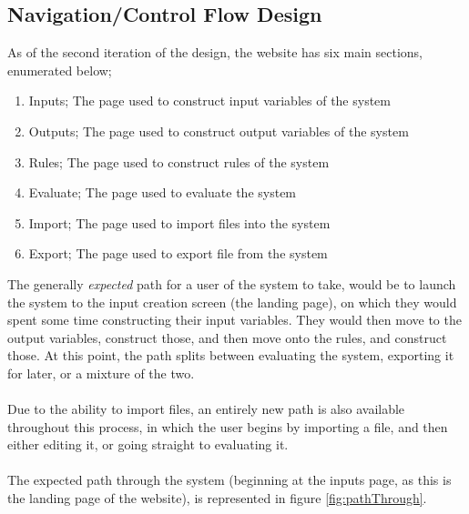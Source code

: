 \newpage
\subsection{Navigation/Control Flow Design}	
\label{subsec:nav}	
As of the second iteration of the design, the website has six main sections, enumerated below;
\begin{enumerate}
\item Inputs;
The page used to construct input variables of the system
\item Outputs;
The page used to construct output variables of the system
\item Rules;
The page used to construct rules of the system
\item Evaluate;
The page used to evaluate the system
\item Import;
The page used to import files into the system
\item Export;
The page used to export file from the system
\end{enumerate}
\noindent 
The generally \emph{expected} path for a user of the system to take, would be to launch the system to the input creation screen (the landing page), on which they would spent some time constructing their input variables. They would then move to the output variables, construct those, and then move onto the rules, and construct those. At this point, the path splits between evaluating the system, exporting it for later, or a mixture of the two. \ \\
\ \\
Due to the ability to import files, an entirely new path is also available throughout this process, in which the user begins by importing a file, and then either editing it, or going straight to evaluating it.\ \\
\ \\
The expected path through the system (beginning at the inputs page, as this is the landing page of the website), is represented in figure \ref{fig:pathThrough}.


